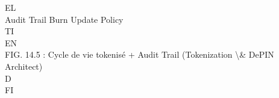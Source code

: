 \documentclass[12pt,landscape,a4paper]{article}
\begin{document}
\vspace{0.5em}
\vspace{0.5em}
\vspace{0.5em}
EL\\
Audit Trail          Burn           Update Policy\\
\vspace{0.5em}
\vspace{0.5em}
\vspace{0.5em}
\vspace{0.5em}
TI\\
EN\\
FIG. 14.5 : Cycle de vie tokenisé + Audit Trail (Tokenization \textbackslash{}& DePIN Architect)\\
\vspace{0.5em}
\vspace{0.5em}
\vspace{0.5em}
\vspace{0.5em}
D\\
FI\\
\end{document}
